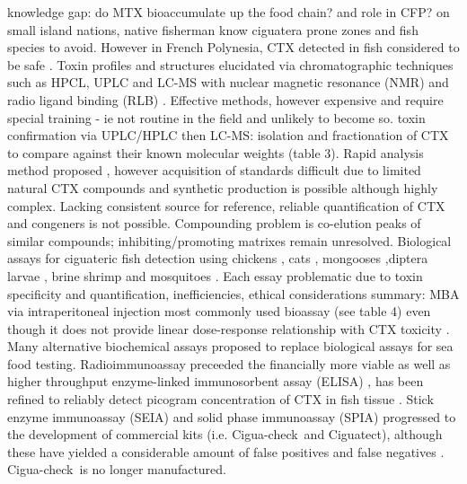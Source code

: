 \documentclass[12pt]{article}
\begin{document}
knowledge gap: do MTX bioaccumulate up the food chain? and role in CFP?
on small island nations, native fisherman know ciguatera prone zones and fish species to avoid. However in French Polynesia, CTX detected in fish considered to be safe \cite{darius2007ciguatera}.
Toxin profiles and structures elucidated via chromatographic techniques such as HPCL, UPLC and LC-MS with nuclear magnetic resonance (NMR) \cite{legrand1989isolation,murata1990structures,murata1990structures,satake1996isolation} and radio ligand binding (RLB) \cite{hamilton2002multiple,hamilton2002isolation}. Effective methods, however expensive and require special training - ie not routine in the field and unlikely to become so. 
toxin confirmation via UPLC/HPLC then LC-MS: isolation and fractionation of CTX to compare against their known molecular weights (table 3). Rapid analysis method proposed \cite{lewis2009rapid}, however acquisition of standards difficult due to limited natural CTX compounds \cite{berdalet2012global} and synthetic production is possible \cite{hirama2001total} although highly complex. Lacking consistent source for reference, reliable quantification of CTX and congeners is not possible. Compounding problem is co-elution peaks of similar compounds; inhibiting/promoting matrixes remain unresolved.
Biological assays for ciguateric fish detection using chickens \cite{}, cats \cite{larson1967ciguatera}, mongooses \cite{hokama1977radioimmunoassay},diptera larvae \cite{labrousse1996toxicological}, brine shrimp \cite{granade1976ciguatera} and mosquitoes \cite{bagnis1987use}. Each essay problematic due to toxin specificity and quantification, inefficiencies, ethical considerations summary: \cite{dickey2010ciguatera}
MBA via intraperitoneal injection most commonly used bioassay (see table 4) even though it does not provide linear dose-response relationship with CTX toxicity \cite{hoffman1983mouse}. 
Many alternative biochemical assays proposed to replace biological assays for sea food testing. Radioimmunoassay \cite{hokama1977radioimmunoassay} preceeded the financially more viable as well as higher throughput enzyme-linked immunosorbent assay (ELISA) \cite{hokama1983rapid}, has been refined to reliably detect picogram concentration of CTX in fish tissue \cite{campora2008detection,campora2010evaluating}.
Stick enzyme immunoassay (SEIA) \cite{hokama1985rapid} and solid phase immunoassay (SPIA) \cite{hokama1990simplified} progressed to the development of commercial kits (i.e. Cigua-check\textregistered \ and Ciguatect\textregistered), although these have yielded a considerable amount of false positives and false negatives \cite{wong2005study}. Cigua-check\textregistered \ is no longer manufactured.
\end{document}
